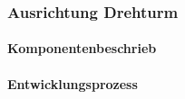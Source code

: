 \subsubsection{Ausrichtung Drehturm}

\paragraph{Komponentenbeschrieb}



\paragraph{Entwicklungsprozess}
